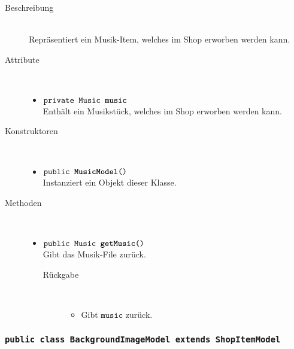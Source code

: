 \begin{description}
\item[Beschreibung] \hfill \\ Repräsentiert ein Musik-Item, welches im Shop erworben werden kann.

\item[Attribute] \hfill \\
	\vspace{-.8cm}
	\begin{itemize}
		\item $\texttt{private Music \textbf{music}}$ \\ Enthält ein Musikstück, welches im Shop erworben werden kann.

		\end{itemize}
	
\item[Konstruktoren] \hfill \\
	\vspace{-.8cm}
	\begin{itemize}
		\item $\texttt{public \textbf{MusicModel}()}$ \\ Instanziert ein Objekt dieser Klasse.

	\end{itemize}
	
\item[Methoden] \hfill \\
	\vspace{-.8cm}
	\begin{itemize}
		\item $\texttt{public Music \textbf{getMusic}()}$ \\ Gibt das Musik-File zurück.
		\begin{description}
			\item[Rückgabe] \hfill \\
			\vspace{-.8cm}
			\begin{itemize}
				\item Gibt $\texttt{music}$ zurück.
			\end{itemize}
			\end{description}
		
	\end{itemize}
\end{description}

\subsubsection{\normalfont \texttt{public class \textbf{BackgroundImageModel} extends ShopItemModel}}

